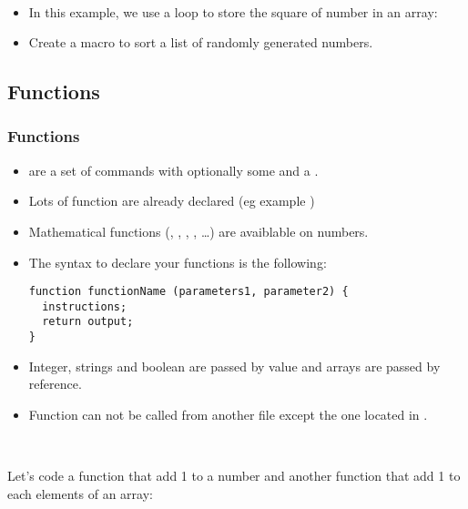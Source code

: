 \begin{frame}
  \begin{example}~\par
    \begin{itemize}
    \item  In this example, we use a loop to store the square of number in an array:
      
    \item Create a macro to sort a list of randomly generated numbers.
    \end{itemize}
  \end{example}
\end{frame}

\subsection{Functions}
\begin{frame}[fragile]
  \frametitle<presentation>{Functions}
  \begin{itemize}
  \item {} are a set of commands with optionally some
     and a .
  \item Lots of function are already declared (eg example )
  \item Mathematical functions (, , , , \dots) are avaiblable on numbers.
  \item The syntax to declare your  functions is the following:
\begin{verbatim}
function functionName (parameters1, parameter2) {
  instructions;
  return output;
}
\end{verbatim}
  \item Integer, strings and boolean are passed by value and arrays are passed by reference.
  \item Function can not be called from another file
    except the one located in .
  \end{itemize}
\end{frame}

\begin{frame}
  \begin{example}[Function]~\par
    Let's code a function that add 1 to a number and another function that add 1
    to each elements of an array: \par
    
  \end{example}
\end{frame}

